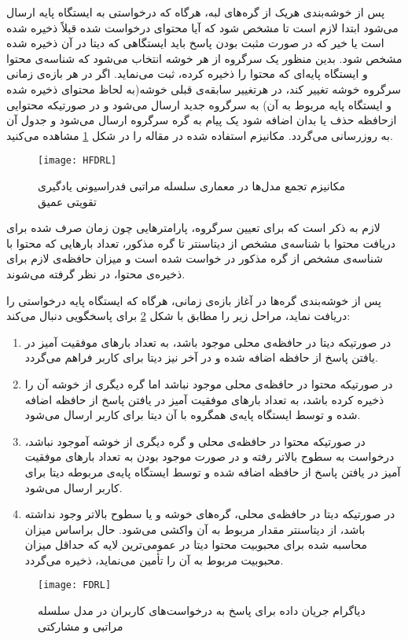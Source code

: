 پس از خوشه‌بندی هریک از گره‌های لبه،‌ هرگاه که درخواستی به ایستگاه پایه ارسال می‌شود ابتدا لازم است تا مشخص شود که آیا محتوای درخواست شده قبلاً ذخیره شده است یا خیر که در صورت مثبت بودن پاسخ باید ایستگا‌هی که دیتا در آن ذخیره شده مشخص شود. بدین منظور یک سرگروه از هر خوشه انتخاب می‌شود که شناسه‌ی محتوا و ایستگاه پایه‌ای که محتوا را ذخیره کرده، ثبت می‌نماید. اگر در هر بازه‌ی زمانی سرگروه خوشه تغییر کند، در هرتغییر سابقه‌ی قبلی خوشه(به لحاظ محتوای ذخیره شده و ایستگاه پایه مربوط به آن) به سرگروه جدید ارسال می‌شود و در صورتیکه محتوایی ازحافظه حذف یا بدان اضافه شود یک پیام به گره سرگروه ارسال می‌شود و جدول آن به روزرسانی می‌گردد. مکانیزم استفاده شده در مقاله را در شکل \ref{fig:hfdrl} مشاهده می‌کنید.

\begin{figure}[ht]
	\centerline{\texttt{[image: HFDRL]}}
	\caption{مکانیزم تجمع مدل‌ها در معماری سلسله مراتبی فدراسیونی یادگیری تقویتی عمیق}
	\label{fig:hfdrl}
\end{figure}

 لازم به ذکر است که برای تعیین سرگروه، پارامترهایی چون زمان صرف شده برای دریافت محتوا با شناسه‌ی مشخص از دیتاسنتر تا گره مذکور، تعداد بارهایی که محتوا با شناسه‌ی مشخص از گره مذکور در خواست شده است و میزان حافظه‌ی لازم برای ذخیره‌ی محتوا، در نظر گرفته می‌شوند.
 
 پس از خوشه‌بندی گره‌ها در آغاز بازه‌ی زمانی،‌ هرگاه که ایستگاه پایه درخواستی را دریافت نماید، مراحل زیر را مطابق با شکل \ref{fig:fdrl} برای پاسخگویی دنبال می‌کند:
 \begin{enumerate}
 	\item 
 	در صورتیکه دیتا در حافظه‌ی محلی موجود باشد، به تعداد بارهای موفقیت آمیز در یافتن پاسخ از حافظه اضافه شده و در آخر نیز دیتا برای کاربر فراهم می‌گردد.
 	\item 
 	در صورتیکه محتوا در حافظه‌ی محلی موجود نباشد اما گره دیگری از خوشه آن را ذخیره کرده باشد، به تعداد بارهای موفقیت آمیز در یافتن پاسخ از حافظه اضافه شده و توسط ایستگاه پایه‌ی همگروه با آن دیتا برای کاربر ارسال می‌شود.
 	\item 
 	در صورتیکه محتوا در حافظه‌ی محلی و گره دیگری از خوشه آموجود نباشد، درخواست به سطوح بالاتر رفته و در صورت موجود بودن به تعداد بارهای موفقیت آمیز در یافتن پاسخ از حافظه اضافه شده و توسط ایستگاه پایه‌ی مربوطه دیتا برای کاربر ارسال می‌شود.
 	\item 
 	در صورتیکه دیتا در حافظه‌ی محلی،‌ گره‌های خوشه و یا سطوح بالاتر وجود نداشته باشد، از دیتاسنتر مقدار مربوط به آن واکشی می‌شود. حال براساس میزان محاسبه شده برای محبوبیت محتوا دیتا در عمومی‌ترین لایه که حداقل میزان محبوبیت مربوط به آن را تأمین می‌نماید، ذخیره می‌گردد. 
 \end{enumerate}

\begin{figure}[ht]
	\centerline{\texttt{[image: FDRL]}}
	\caption{دیاگرام جریان داده برای پاسخ به درخواست‌های کاربران در مدل سلسله مراتبی و مشارکتی}
	\label{fig:fdrl}
\end{figure}

